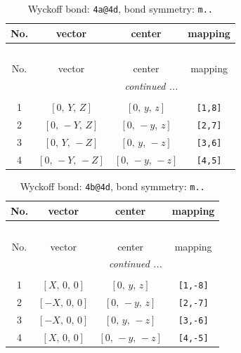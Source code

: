 \documentclass[fleqn,8pt]{jsarticle}
\begin{document}
\begin{longtable}{cccc}
\caption{Wyckoff bond: {\tt 4a@4d}, bond symmetry: {\tt m..}}
 \\
 \hline \hline
No. & vector & center & mapping \\ \hline \endfirsthead

\multicolumn{3}{l}{\tablename\ \thetable{}} \\
 \hline \hline
No. & vector & center & mapping \\ \hline \endhead

 \hline \hline
\multicolumn{3}{r}{\footnotesize\it continued ...} \\ \endfoot

 \hline \hline
\multicolumn{3}{r}{} \\ \endlastfoot

1 & $\left[ 0,\, Y,\, Z \right]$ & $\left[ 0,\, y,\, z \right]$ & {\tt [1,8]} \\ \hline
2 & $\left[ 0,\, - Y,\, Z \right]$ & $\left[ 0,\, - y,\, z \right]$ & {\tt [2,7]} \\ \hline
3 & $\left[ 0,\, Y,\, - Z \right]$ & $\left[ 0,\, y,\, - z \right]$ & {\tt [3,6]} \\ \hline
4 & $\left[ 0,\, - Y,\, - Z \right]$ & $\left[ 0,\, - y,\, - z \right]$ & {\tt [4,5]} \\
\end{longtable}
\renewcommand{\arraystretch}{1.2}
\begin{longtable}{cccc}
\caption{Wyckoff bond: {\tt 4b@4d}, bond symmetry: {\tt m..}}
 \\
 \hline \hline
No. & vector & center & mapping \\ \hline \endfirsthead

\multicolumn{3}{l}{\tablename\ \thetable{}} \\
 \hline \hline
No. & vector & center & mapping \\ \hline \endhead

 \hline \hline
\multicolumn{3}{r}{\footnotesize\it continued ...} \\ \endfoot

 \hline \hline
\multicolumn{3}{r}{} \\ \endlastfoot

1 & $\left[ X,\, 0,\, 0 \right]$ & $\left[ 0,\, y,\, z \right]$ & {\tt [1,-8]} \\ \hline
2 & $\left[ - X,\, 0,\, 0 \right]$ & $\left[ 0,\, - y,\, z \right]$ & {\tt [2,-7]} \\ \hline
3 & $\left[ - X,\, 0,\, 0 \right]$ & $\left[ 0,\, y,\, - z \right]$ & {\tt [3,-6]} \\ \hline
4 & $\left[ X,\, 0,\, 0 \right]$ & $\left[ 0,\, - y,\, - z \right]$ & {\tt [4,-5]} \\
\end{longtable}
\end{document}
